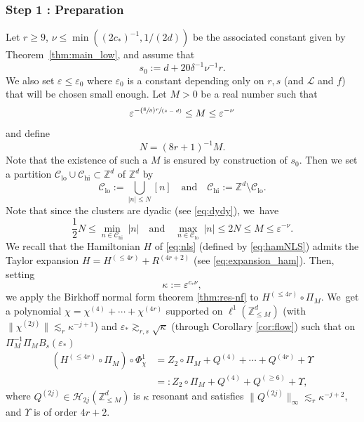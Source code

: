 \documentclass[JEP,XML,SOM,Unicode,published]{cedram}
\newcommand{\Psfrac}[2]{(\sfrac{#1}{#2})}
\newcommand{\spfrac}[2]{\sfrac{#1}{(#2)}}
\theoremstyle{plain}
\theoremstyle{definition}
\DeclareMathOperator{\hi}{hi}
\DeclareMathOperator{\lo}{lo}
\newcommand{\1}{\mathbf{1}}
\newcommand{\Clo}{\mathscr{C}_{\lo}}
\newcommand{\Chigh}{\mathscr{C}_{\hi}}
\begin{document}
\subsubsection*{Step 1 : Preparation}
Let $r\geq 9$, $\nu \leq \min((2c_\ast)^{-1},1/(2d))$ be the associated constant given by Theorem~\ref{thm:main_low}, and assume that
\begin{equation}
\label{eq:s}
s_0 := d+20 \delta^{-1} \nu^{-1} r.
\end{equation}
We also set $\varepsilon \leq \varepsilon_0$ where $\varepsilon_0$ is a constant depending only on $r,s$ (and $\mathscr{L}$ and $f$) that will be chosen small enough. Let $M>0$ be a real number such that
\begin{equation}
\label{eq:boundonM}
\varepsilon^{-\Psfrac{8}{\delta}\spfrac{r}{s-d}}\leq M \leq \varepsilon^{-{\nu}}
\end{equation}
and define
\[
N = (8r+1)^{-1} M.
\]
Note that the existence of such a $M$ is ensured by construction of $s_0$.
Then we set a partition $\Clo\cup \Chigh \subset \mathbb{Z}^d$ of $\mathbb{Z}^d$ by
\begin{equation}
\label{eq:Clo}
\Clo := \bigcup_{|n|\leq N}[n] \quad \mathrm{and} \quad \Chigh := \mathbb{Z}^d \setminus \Clo.
\end{equation}
Note that since the clusters are dyadic (see \eqref{eq:dydy}), we~have
\begin{equation}
\label{eq:m-high}
\frac{1}{2}N\leq \underset{n\in\Chigh}{\min}\ |n|\quad \mathrm{and} \quad \underset{n\in\Clo}{\max}\ |n|\leq 2N \leq M \leq \varepsilon^{-{\nu}}.
\end{equation}
We recall that the Hamiltonian $H$ of \eqref{eq:nls} (defined by \eqref{eq:hamNLS}) admits the Taylor expansion $H = H^{(\leq 4r)} + R^{(4r+2)} $ (see \eqref{eq:expansion_ham}). Then, setting
\[
\kappa := \varepsilon^{c_\ast \nu},
\]
we apply the Birkhoff normal form theorem \ref{thm:res-nf} to $H^{(\leq 4r)}\circ \Pi_M$. We~get a polynomial $\chi = \chi^{(4)} + \cdots + \chi^{(4r)}$ supported on $\ell^1(\mathbb{Z}^d_{\leq M})$ (with $\| \chi^{(2j)}\| \lesssim_r \kappa^{-j+1} $) and $\varepsilon_\ast \gtrsim_{r,s} \sqrt{\kappa}$ (through Corollary \ref{cor:flow})
such that on $\Pi_{ M}^{-1}\Pi_{ M}B_s(\varepsilon_*) $
\begin{equation}
\label{eq:defHloflat}
\begin{split}
(H^{(\leq 4r)}\circ \Pi_M) \circ \Phi_{\chi}^1 &= Z_2\circ \Pi_M + Q^{(4)} + \cdots+ Q^{(4r)} + \Upsilon \\
& =: Z_2\circ \Pi_M + Q^{(4)} + Q^{(\geq 6)} + \Upsilon,
\end{split}
\end{equation}
where $Q^{(2j)} \in \mathcal{H}_{2j}(\mathbb{Z}^d_{\leq M})$ is $\kappa$ resonant and satisfies $\| Q^{(2j)} \|_{\infty} \lesssim_r \kappa^{-j+2}$, and $ \Upsilon$ is of order $4r +2$.
\end{document}
